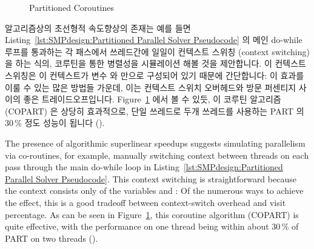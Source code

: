 \begin{figure}[tb]
\centering
{}
\caption{Partitioned Coroutines}
\label{fig:SMPdesign:Partitioned Coroutines}
\end{figure}

알고리즘상의 초선형적 속도향상의 존재는 예를 들면
Listing~\ref{lst:SMPdesign:Partitioned Parallel Solver Pseudocode} 의 메인
do-while 루프를 통과하는 각 패스에서 쓰레드간에 일일이 컨텍스트 스위칭 (context
switching) 을 하는 식의, 코루틴을 통한 병렬성을 시뮬레이션 해볼 것을
제안합니다.
이 컨텍스트 스위칭은 이 컨텍스트가 변수  와  만으로 구성되어 있기
때문에 간단합니다: 이 효과를 이룰 수 있는 많은 방법들 가운데, 이는 컨텍스트
스위치 오버헤드와 방문 퍼센티지 사이의 좋은 트레이드오프입니다.
Figure~\ref{fig:SMPdesign:Partitioned Coroutines}
에서 볼 수 있듯, 이 코루틴 알고리즘 (COPART) 은 상당히 효과적으로, 단일
쓰레드로 두개 쓰레드를 사용하는 PART 의 30\,\% 정도 성능이 됩니다
().

\iffalse

The presence of algorithmic superlinear speedups suggests simulating
parallelism via co-routines, for example, manually switching context
between threads on each pass through the main do-while loop in
Listing~\ref{lst:SMPdesign:Partitioned Parallel Solver Pseudocode}.
This context switching is straightforward because the context
consists only of the variables  and : Of the numerous
ways to achieve the effect, this is a good tradeoff between
context-switch overhead and visit percentage.
As can be seen in
Figure~\ref{fig:SMPdesign:Partitioned Coroutines},
this coroutine algorithm (COPART) is quite effective, with the performance
on one thread being within about 30\,\% of PART on two threads
().

